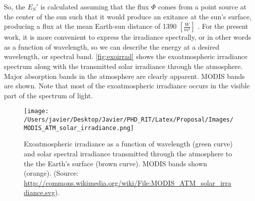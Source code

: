So, the $E_S'$ is calculated assuming that the flux $\Phi$ comes from a point source at the center of the sun such that it would produce an exitance at the sun's surface, producing a flux at the mean Earth-sun distance of 1390 $\left[\frac{W}{m^2}\right]$ . For the present work, it is more convenient to express the irradiance spectrally, or in other words as a function of wavelength, so we can describe the energy at a desired wavelength, or spectral band. \autoref{fig:exoirrad} shows the exoatmospheric irradiance spectrum  along with the transmitted solar irradiance through the atmosphere. Major absorption bands in the atmosphere are clearly apparent. MODIS bands are shown. Note that most of the exoatmospheric irradiance occurs in the visible part of the spectrum of light.

\begin{figure}[htb]
  \centering
  \texttt{[image: /Users/javier/Desktop/Javier/PHD\_RIT/Latex/Proposal/Images/MODIS\_ATM\_solar\_irradiance.png]}
\caption{Exoatmospheric irradiance as a function of wavelength (green curve) and solar spectral irradiance transmitted through the  atmosphere to the the Earth's surface (brown curve). MODIS bands shown (orange).  (Source: \protect\url{http://commons.wikimedia.org/wiki/File:MODIS_ATM_solar_irradiance.svg}).}
\label{fig:exoirrad} 
\end{figure}

